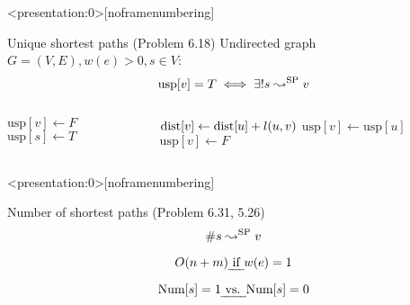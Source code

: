 
\begin{frame}
  \centerline{}
\end{frame}

\begin{frame}{}
  \begin{columns}
      
  \end{columns}
\end{frame}

\begin{frame}<presentation:0>[noframenumbering]
  \begin{exampleblock}{Unique shortest paths (Problem 6.18)}
    Undirected graph $G = (V, E), w(e) > 0, s \in V$:
    \[
      \text{usp}[v] = T \iff \exists! s \leadsto^{\text{SP}} v 
    \]
  \end{exampleblock}

  \begin{columns}[t]
      \begin{algorithmic}
	  \State $\text{usp}[v] \gets F$
	\EndFor
	\State $\text{usp}[s] \gets T$
      \end{algorithmic}
      \begin{algorithmic}
	  \State $\text{dist}[v] \gets \text{dist}[u] + l(u,v)$
	  \State $\text{usp}[v] \gets \text{usp}[u]$
	  \State $\text{usp}[v] \gets F$
	\EndIf
      \end{algorithmic}
  \end{columns}
\end{frame}
\begin{frame}<presentation:0>[noframenumbering]
  \begin{exampleblock}{Number of shortest paths (Problem 6.31, 5.26)}
    \[
      \# s \leadsto^{\text{SP}} v
    \]

    \[
      O(n + m) \text{\emph{ if }} w(e) = 1
    \]
  \end{exampleblock}

  \[
    \text{Num}[s] = 1 \text{\emph{ vs. }} \text{Num}[s] = 0
  \]
\end{frame}

